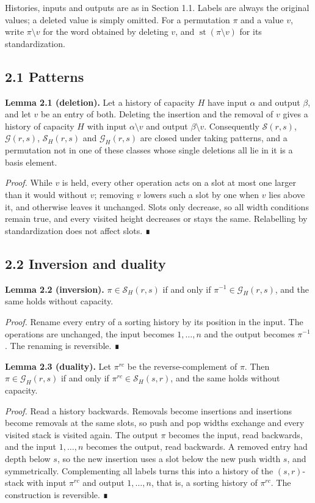 \documentclass[11pt,letterpaper]{article}
\begin{document}
Histories, inputs and outputs are as in Section 1.1. Labels are always
the original values; a deleted value is simply omitted. For a
permutation \(\pi\) and a value \(v\), write \(\pi\setminus v\) for the
word obtained by deleting \(v\), and
\(\operatorname{st}(\pi\setminus v)\) for its standardization.

\subsection{2.1 Patterns}\label{patterns}

\textbf{Lemma 2.1 (deletion).} Let a history of capacity \(H\) have
input \(\alpha\) and output \(\beta\), and let \(v\) be an entry of
both. Deleting the insertion and the removal of \(v\) gives a history of
capacity \(H\) with input \(\alpha\setminus v\) and output
\(\beta\setminus v\). Consequently \(\mathcal S(r,s)\),
\(\mathcal G(r,s)\), \(\mathcal S_H(r,s)\) and \(\mathcal G_H(r,s)\) are
closed under taking patterns, and a permutation not in one of these
classes whose single deletions all lie in it is a basis element.

\emph{Proof.} While \(v\) is held, every other operation acts on a slot
at most one larger than it would without \(v\); removing \(v\) lowers
such a slot by one when \(v\) lies above it, and otherwise leaves it
unchanged. Slots only decrease, so all width conditions remain true, and
every visited height decreases or stays the same. Relabelling by
standardization does not affect slots. ∎

\subsection{2.2 Inversion and duality}\label{inversion-and-duality}

\textbf{Lemma 2.2 (inversion).} \(\pi\in\mathcal S_H(r,s)\) if and only
if \(\pi^{-1}\in\mathcal G_H(r,s)\), and the same holds without
capacity.

\emph{Proof.} Rename every entry of a sorting history by its position in
the input. The operations are unchanged, the input becomes \(1,\dots,n\)
and the output becomes \(\pi^{-1}\). The renaming is reversible. ∎

\textbf{Lemma 2.3 (duality).} Let \(\pi^{rc}\) be the reverse-complement
of \(\pi\). Then \(\pi\in\mathcal G_H(r,s)\) if and only if
\(\pi^{rc}\in\mathcal S_H(s,r)\), and the same holds without capacity.

\emph{Proof.} Read a history backwards. Removals become insertions and
insertions become removals at the same slots, so push and pop widths
exchange and every visited stack is visited again. The output \(\pi\)
becomes the input, read backwards, and the input \(1,\dots,n\) becomes
the output, read backwards. A removed entry had depth below \(s\), so
the new insertion uses a slot below the new push width \(s\), and
symmetrically. Complementing all labels turns this into a history of the
\((s,r)\)-stack with input \(\pi^{rc}\) and output \(1,\dots,n\), that
is, a sorting history of \(\pi^{rc}\). The construction is reversible. ∎
\end{document}
